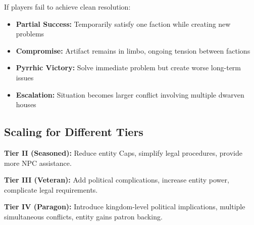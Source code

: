 \documentclass[11pt]{article}
\begin{document}
If players fail to achieve clean resolution:
\begin{itemize}
\item \textbf{Partial Success:} Temporarily satisfy one faction while creating new problems
\item \textbf{Compromise:} Artifact remains in limbo, ongoing tension between factions
\item \textbf{Pyrrhic Victory:} Solve immediate problem but create worse long-term issues
\item \textbf{Escalation:} Situation becomes larger conflict involving multiple dwarven houses
\end{itemize}

\subsection{Scaling for Different Tiers}

\textbf{Tier II (Seasoned):} Reduce entity Caps, simplify legal procedures, provide more NPC assistance.

\textbf{Tier III (Veteran):} Add political complications, increase entity power, complicate legal requirements.

\textbf{Tier IV (Paragon):} Introduce kingdom-level political implications, multiple simultaneous conflicts, entity gains patron backing.
\end{document}

